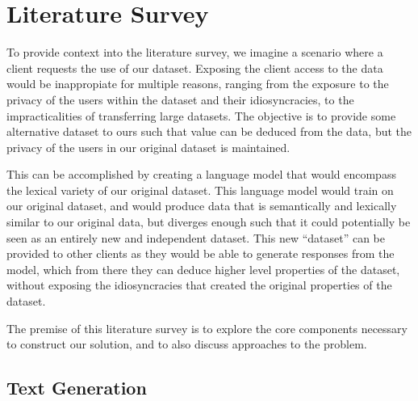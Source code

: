 \documentclass[12pt,twoside]{report}
\begin{document}



\chapter{Literature Survey}

To provide context into the literature survey, we imagine a scenario where a client requests the use of our dataset. Exposing the client access to the data would be inappropiate for multiple reasons, ranging from the exposure to the privacy of the users within the dataset and their idiosyncracies, to the impracticalities of transferring large datasets. The objective is to provide some alternative dataset to ours such that value can be deduced from the data, but the privacy of the users in our original dataset is maintained.

This can be accomplished by creating a language model that would encompass the lexical variety of our original dataset. This language model would train on our original dataset, and would produce data that is semantically and lexically similar to our original data, but diverges enough such that it could potentially be seen as an entirely new and independent dataset. This new ``dataset'' can be provided to other clients as they would be able to generate responses from the model, which from there they can deduce higher level properties of the dataset, without exposing the idiosyncracies that created the original properties of the dataset.

The premise of this literature survey is to explore the core components necessary to construct our solution, and to also discuss approaches to the problem.

\section{Text Generation}
\end{document}
